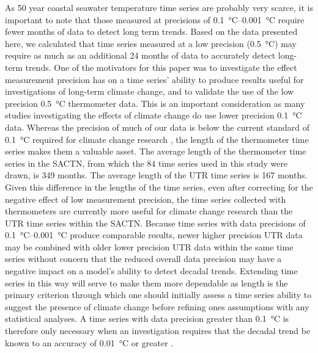 \documentclass[]{ametsoc}
\begin{document}
As 50 year coastal seawater temperature time series are probably very scarce, it is important to note that those measured at precisions of \SIrange{0.1}{0.001}{\degreeCelsius} require fewer months of data to detect long term trends. Based on the data presented here, we calculated that time series measured at a low precision (\SI{0.5}{\degreeCelsius}) may require as much as an additional 24 months of data to accurately detect long-term trends. One of the motivators for this paper was to investigate the effect measurement precision has on a time series' ability to produce results useful for investigations of long-term climate change, and to validate the use of the low precision \SI{0.5}{\degreeCelsius} thermometer data. This is an important consideration as many studies investigating the effects of climate change \citep[\emph{e.g.}][]{Grant2010, Scherrer2010, Lathlean2012} do use lower precision \SI{0.1}{\degreeCelsius} data. Whereas the precision of much of our data is below the current standard of \SI{0.1}{\degreeCelsius} required for climate change research \citep{Ohring2005,Jarraud2008}, the length of the thermometer time series makes them a valuable asset. The average length of the thermometer time series in the SACTN, from which the 84 time series used in this study were drawn, is 349 months. The average length of the UTR time series is 167 months. Given this difference in the lengths of the time series, even after correcting for the negative effect of low measurement precision, the time series collected with thermometers are currently more useful for climate change research than the UTR time series within the SACTN. Because time series with data precisions of \SIrange{0.1}{0.001}{\degreeCelsius} produce comparable results, newer higher precision UTR data may be combined with older lower precision UTR data within the same time series without concern that the reduced overall data precision may have a negative impact on a model's ability to detect decadal trends. Extending time series in this way will serve to make them more dependable as length is the primary criterion through which one should initially assess a time series ability to suggest the presence of climate change before refining ones assumptions with any statistical analyses. A time series with data precision greater than \SI{0.1}{\degreeCelsius} is therefore only necessary when an investigation requires that the decadal trend be known to an accuracy of \SI{0.01}{\degreeCelsius} or greater \citep[\emph{e.g.}][]{Karl2015}.
\end{document}
